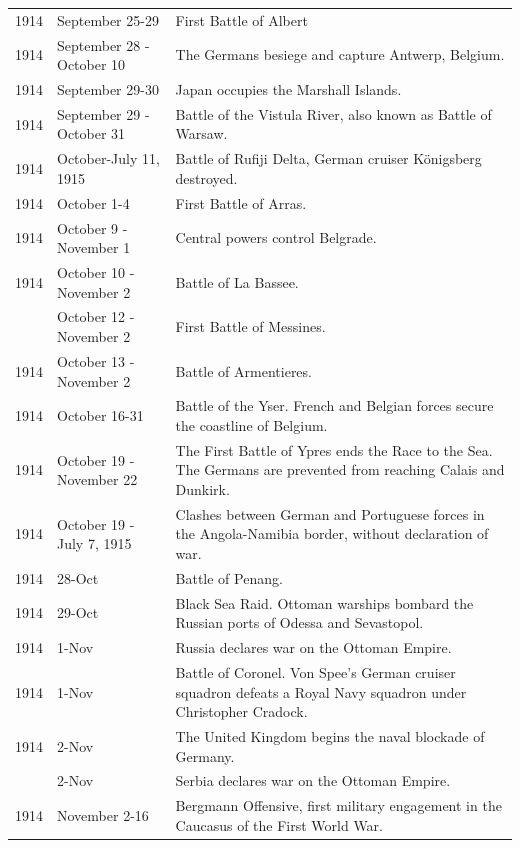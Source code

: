 \documentclass[
  openany]{book}
\begin{document}
\begin{longtable}[t]{rl>{\raggedright\arraybackslash}p{22em}}
1914 & September 25-29 & First Battle of Albert\\
\rowcolor{gray!6}  1914 & September 28 - October 10 & The Germans besiege and capture Antwerp, Belgium.\\
1914 & September 29-30 & Japan occupies the Marshall Islands.\\
\addlinespace
\rowcolor{gray!6}  1914 & September 29 - October 31 & Battle of the Vistula River, also known as Battle of Warsaw.\\
1914 & October-July 11, 1915 & Battle of Rufiji Delta, German cruiser Königsberg destroyed.\\
\rowcolor{gray!6}  1914 & October 1-4 & First Battle of Arras.\\
1914 & October 9 - November 1 & Central powers control Belgrade.\\
\rowcolor{gray!6}  1914 & October 10 - November 2 & Battle of La Bassee.\\
\addlinespace
1914 & October 12 - November 2 & First Battle of Messines.\\
\rowcolor{gray!6}  1914 & October 13 - November 2 & Battle of Armentieres.\\
1914 & October 16-31 & Battle of the Yser. French and Belgian forces secure the coastline of Belgium.\\
\rowcolor{gray!6}  1914 & October 19 - November 22 & The First Battle of Ypres ends the Race to the Sea. The Germans are prevented from reaching Calais and Dunkirk.\\
1914 & October 19 - July 7, 1915 & Clashes between German and Portuguese forces in the Angola-Namibia border, without declaration of war.\\
\addlinespace
\rowcolor{gray!6}  1914 & 28-Oct & Battle of Penang.\\
1914 & 29-Oct & Black Sea Raid. Ottoman warships bombard the Russian ports of Odessa and Sevastopol.\\
\rowcolor{gray!6}  1914 & 1-Nov & Russia declares war on the Ottoman Empire.\\
1914 & 1-Nov & Battle of Coronel. Von Spee's German cruiser squadron defeats a Royal Navy squadron under Christopher Cradock.\\
\rowcolor{gray!6}  1914 & 2-Nov & The United Kingdom begins the naval blockade of Germany.\\
\addlinespace
1914 & 2-Nov & Serbia declares war on the Ottoman Empire.\\
\rowcolor{gray!6}  1914 & November 2-16 & Bergmann Offensive, first military engagement in the Caucasus of the First World War.\\

\end{longtable}
\end{document}
